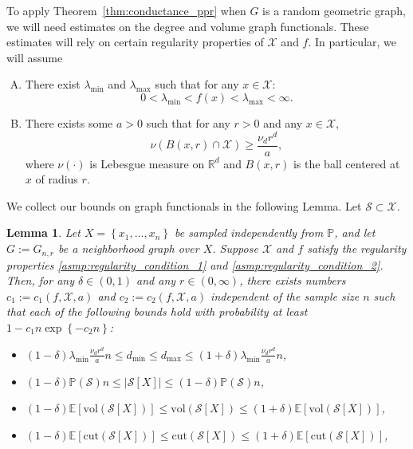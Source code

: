 \documentclass{article}
\newcommand{\Reals}{\mathbb{R}}
\newcommand{\abs}[1]{\left \lvert #1 \right \rvert}
\newcommand{\vol}{\mathrm{vol}}
\newcommand{\set}[1]{\left\{#1\right\}}
\newcommand{\Pbb}{\mathbb{P}}
\newcommand{\1}{\mathbf{1}}
\theoremstyle{alden}
\theoremstyle{aldenthm}
\newtheorem{lemma}{Lemma}
\theoremstyle{remark}
\begin{document}
To apply Theorem~\ref{thm:conductance_ppr} when $G$ is a random geometric graph, we will need estimates on the degree and volume graph functionals. These estimates will rely on certain regularity properties of $\mathcal{X}$ and $f$. In particular, we will assume
\begin{enumerate}[(A)]
	\item 
	\label{asmp:regularity_condition_1}
	There exist $\lambda_{\min}$ and $\lambda_{\max}$ such that for any $x \in \mathcal{X}$:
	\begin{equation*}
	0 < \lambda_{\min} < f(x) < \lambda_{\max} < \infty.
	\end{equation*}
	\item
	\label{asmp:regularity_condition_2}
	There exists some $a > 0$ such that for any $r >0 $ and any $x \in \mathcal{X}$,
	\begin{equation*}
	\nu(B(x,r) \cap \mathcal{X}) \geq \frac{\nu_d r^d}{a},
	\end{equation*}
	where $\nu(\cdot)$ is Lebesgue measure on $\Reals^d$ and $B(x,r)$ is the ball centered at $x$ of radius $r$. 
\end{enumerate}
We collect our bounds on graph functionals in the following Lemma. Let $\mathcal{S} \subset \mathcal{X}$.
\begin{lemma}
	\label{lem:graph_functional_concentration}
	Let $X = \set{x_1,\ldots,x_n}$ be sampled independently from $\Pbb$, and let $G := G_{n,r}$ be a neighborhood graph over $X$. Suppose $\mathcal{X}$ and $f$ satisfy the regularity properties \ref{asmp:regularity_condition_1} and \ref{asmp:regularity_condition_2}. Then, for any $\delta \in (0,1)$ and any $r \in (0,\infty)$, there exists numbers $c_1 := c_1(f,\mathcal{X},a)$ and $c_2 := c_2(f,\mathcal{X},a)$ independent of the sample size $n$ such that each of the following bounds hold with probability at least $1 - c_1n\exp\set{-c_2n}$:
	\begin{itemize}
		\item $(1 - \delta) \lambda_{\min} \frac{\nu_dr^d}{a} n \leq d_{\min} \leq d_{\max} \leq (1 + \delta) \lambda_{\min} \frac{\nu_dr^d}{a}n$, 
		\item $(1 - \delta) \mathbb{P}(\mathcal{S}) n \leq \abs{\mathcal{S}[X]} \leq (1 - \delta) \mathbb{P}(\mathcal{S}) n$,
		\item $(1 - \delta) \mathbb{E}[\vol(\mathcal{S}[X])] \leq \vol(\mathcal{S}[X]) \leq (1 + \delta) \mathbb{E}[\vol(\mathcal{S}[X])]$,
		\item $(1 - \delta) \mathbb{E}[\mathrm{cut}(\mathcal{S}[X])] \leq \mathrm{cut}(\mathcal{S}[X]) \leq (1 + \delta) \mathbb{E}[\mathrm{cut}(\mathcal{S}[X])]$,
	\end{itemize}
\end{lemma}
\end{document}
